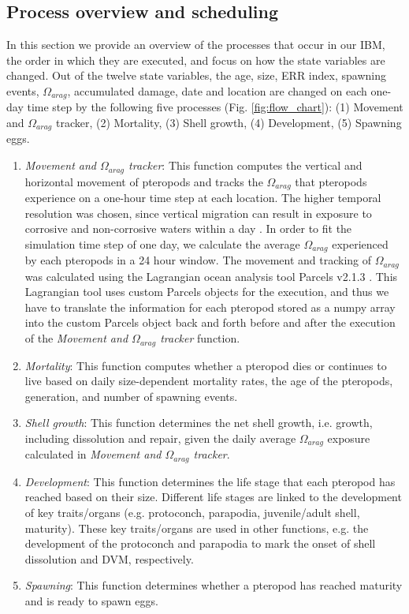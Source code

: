 \subsection{Process overview and scheduling}\label{sec:process_overview}
In this section we provide an overview of the processes that occur in our IBM, the order in which they are executed, and focus on how the state variables are changed. Out of the twelve state variables, the age, size, ERR index, spawning events, $\Omega_{arag}$, accumulated damage, date and location are changed on each one-day time step by the following five processes (Fig. \ref{fig:flow_chart}): (1) Movement and $\Omega_{arag}$ tracker, (2) Mortality, (3) Shell growth, (4) Development, (5) Spawning eggs.
\begin{enumerate}
    \item \textit{Movement and $\Omega_{arag}$ tracker}: This function computes the vertical and horizontal movement of pteropods and tracks the $\Omega_{arag}$ that pteropods experience on a one-hour time step at each location. The higher temporal resolution was chosen, since vertical migration can result in exposure to corrosive and non-corrosive waters within a day \citep{Bednarsek2015VerticalDistribution}. In order to fit the simulation time step of one day, we calculate the average $\Omega_{arag}$ experienced by each pteropods in a 24 hour window. The movement and tracking of $\Omega_{arag}$ was calculated using the Lagrangian ocean analysis tool Parcels v2.1.3 \citep{Delandmeter2019Unbeaching}. This Lagrangian tool uses custom Parcels objects for the execution, and thus we have to translate the information for each pteropod stored as a numpy array \citep{oliphant2006guide} into the custom Parcels object back and forth before and after the execution of the \textit{Movement and $\Omega_{arag}$ tracker} function. 
    \item \textit{Mortality}: This function computes whether a pteropod dies or continues to live based on daily size-dependent mortality rates, the age of the pteropods, generation, and number of spawning events. 
    \item \textit{Shell growth}:  This function determines the net shell growth, i.e. growth, including dissolution and repair, given the daily average $\Omega_{arag}$ exposure calculated in \textit{Movement and $\Omega_{arag}$ tracker}.
    \item \textit{Development}: This function determines the life stage that each pteropod has reached based on their size. Different life stages are linked to the development of key traits/organs (e.g. protoconch, parapodia, juvenile/adult shell, maturity). These key traits/organs are used in other functions, e.g. the development of the protoconch and parapodia to mark the onset of shell dissolution and DVM, respectively.
   \item \textit{Spawning}: This function determines whether a pteropod has reached maturity and is ready to spawn eggs.
\end{enumerate}

